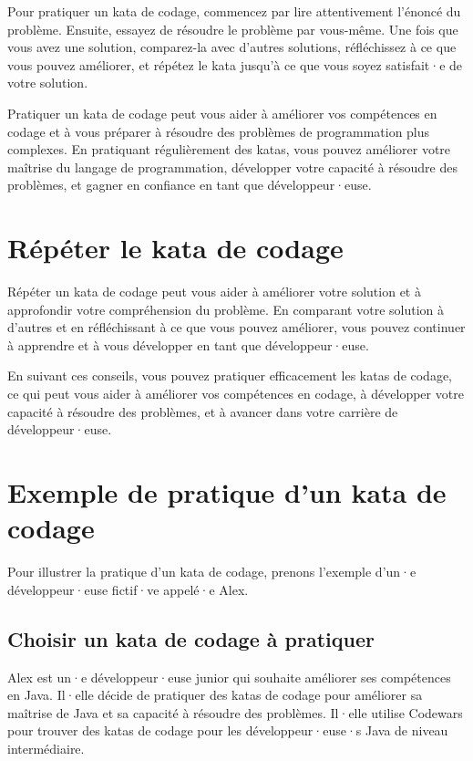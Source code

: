 Pour pratiquer un kata de codage, commencez par lire attentivement l'énoncé du problème. Ensuite, essayez de résoudre le problème par vous-même. Une fois que vous avez une solution, comparez-la avec d'autres solutions, réfléchissez à ce que vous pouvez améliorer, et répétez le kata jusqu'à ce que vous soyez satisfait·e de votre solution.

Pratiquer un kata de codage peut vous aider à améliorer vos compétences en codage et à vous préparer à résoudre des problèmes de programmation plus complexes. En pratiquant régulièrement des katas, vous pouvez améliorer votre maîtrise du langage de programmation, développer votre capacité à résoudre des problèmes, et gagner en confiance en tant que développeur·euse.

\section{Répéter le kata de codage}

Répéter un kata de codage peut vous aider à améliorer votre solution et à approfondir votre compréhension du problème. En comparant votre solution à d'autres et en réfléchissant à ce que vous pouvez améliorer, vous pouvez continuer à apprendre et à vous développer en tant que développeur·euse.

En suivant ces conseils, vous pouvez pratiquer efficacement les katas de codage, ce qui peut vous aider à améliorer vos compétences en codage, à développer votre capacité à résoudre des problèmes, et à avancer dans votre carrière de développeur·euse.

\section{Exemple de pratique d'un kata de codage}

Pour illustrer la pratique d'un kata de codage, prenons l'exemple d'un·e développeur·euse fictif·ve appelé·e Alex.

\subsection{Choisir un kata de codage à pratiquer}

Alex est un·e développeur·euse junior qui souhaite améliorer ses compétences en Java. Il·elle décide de pratiquer des katas de codage pour améliorer sa maîtrise de Java et sa capacité à résoudre des problèmes. Il·elle utilise Codewars pour trouver des katas de codage pour les développeur·euse·s Java de niveau intermédiaire.

